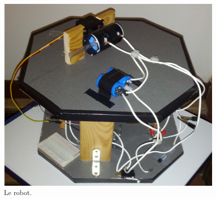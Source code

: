 \begin{figure}
	\begin{center}
		\includegraphics[scale=0.15]{rc/intro.png}
	\end{center}
	\caption{Le robot.}
	\label{int_rob}
\end{figure}



